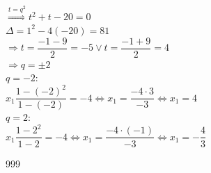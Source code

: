 \documentclass[a4paper]{article}
\begin{document}
$\overset{t = q^2}\Rightarrow t^2 + t - 20 = 0$ \\

$\Delta = 1^2 - 4(-20) = 81$ \\

$\Rightarrow t = \dfrac{-1 - 9}{2} = -5 \vee t = \dfrac{-1 + 9}{2} = 4$ \\

$\Rightarrow q = \pm 2$ \\

$q = -2$: \\

$x_1\dfrac{1 - (-2)^2}{1 - (-2)} = -4 \Leftrightarrow x_1 = \dfrac{-4\cdot3}{-3} \Leftrightarrow x_1 = 4$ \\

$q = 2$: \\

$x_1\dfrac{1 - 2^2}{1 - 2} = -4 \Leftrightarrow x_1 = \dfrac{-4\cdot(-1)}{-3} \Leftrightarrow x_1 = -\dfrac{4}{3}$ \\



\begin{thebibliography}{999}
\end{thebibliography}
\end{document}
